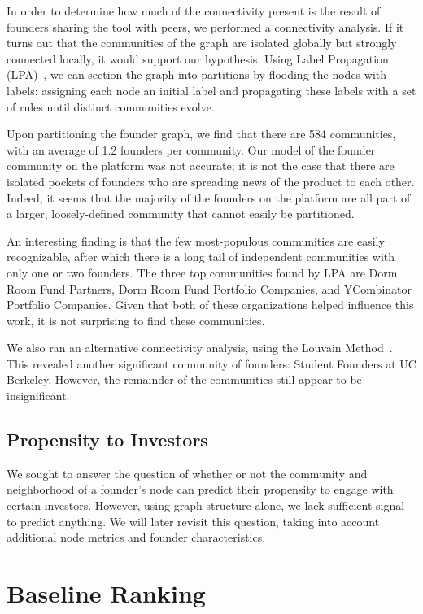 In order to determine how much of the connectivity present is the result of founders sharing the tool with peers, we performed a connectivity analysis. If it turns out that the communities of the graph are isolated globally but strongly connected locally, it would support our hypothesis. Using Label Propagation (LPA)~\cite{2007PhRvE..76c6106R}, we can section the graph into partitions by flooding the nodes with labels: assigning each node an initial label and propagating these labels with a set of rules until distinct communities evolve.

Upon partitioning the founder graph, we find that there are 584 communities, with an average of 1.2 founders per community. Our model of the founder community on the platform was not accurate; it is not the case that there are isolated pockets of founders who are spreading news of the product to each other. Indeed, it seems that the majority of the founders on the platform are all part of a larger, loosely-defined community that cannot easily be partitioned.

An interesting finding is that the few most-populous communities are easily recognizable, after which there is a long tail of independent communities with only one or two founders. The three top communities found by LPA are Dorm Room Fund Partners, Dorm Room Fund Portfolio Companies, and YCombinator Portfolio Companies. Given that both of these organizations helped influence this work, it is not surprising to find these communities.

We also ran an alternative connectivity analysis, using the Louvain Method~\cite{2008JSMTE..10..008B}. This revealed another significant community of founders: Student Founders at UC Berkeley. However, the remainder of the communities still appear to be insignificant.

\subsection{Propensity to Investors}

We sought to answer the question of whether or not the community and neighborhood of a founder's node can predict their propensity to engage with certain investors. However, using graph structure alone, we lack sufficient signal to predict anything. We will later revisit this question, taking into account additional node metrics and founder characteristics.

\section{Baseline Ranking}

